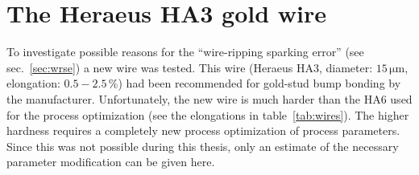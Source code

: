 \section{The Heraeus HA3 gold wire}\label{sec:HA3}
To investigate possible reasons for the ``wire-ripping sparking error'' (see sec.~\ref{sec:wrse}) a new wire was tested. This wire (Heraeus HA3, diameter: $15\,\si{\micro \meter}$, elongation: $0.5-2.5\,\%$) had been recommended for gold-stud bump bonding by the manufacturer. Unfortunately, the new wire is much harder than the HA6 used for the process optimization (see the elongations in table~\ref{tab:wires}). The higher hardness requires a completely new process optimization of process parameters. Since this was not possible during this thesis, only an estimate of the necessary parameter modification can be given here.

